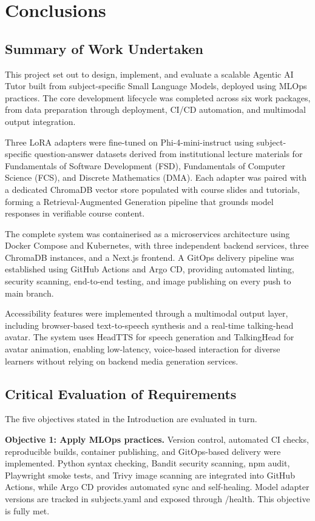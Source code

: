 \chapter{Conclusions}
\label{chap:conclusions}

\section{Summary of Work Undertaken}

This project set out to design, implement, and evaluate a scalable Agentic AI Tutor built from subject-specific Small Language Models, deployed using MLOps practices. The core development lifecycle was completed across six work packages, from data preparation through deployment, CI/CD automation, and multimodal output integration.

Three LoRA adapters were fine-tuned on Phi-4-mini-instruct using subject-specific question-answer datasets derived from institutional lecture materials for Fundamentals of Software Development (FSD), Fundamentals of Computer Science (FCS), and Discrete Mathematics (DMA). Each adapter was paired with a dedicated ChromaDB vector store populated with course slides and tutorials, forming a Retrieval-Augmented Generation pipeline that grounds model responses in verifiable course content.

The complete system was containerised as a microservices architecture using Docker Compose and Kubernetes, with three independent backend services, three ChromaDB instances, and a Next.js frontend. A GitOps delivery pipeline was established using GitHub Actions and Argo CD, providing automated linting, security scanning, end-to-end testing, and image publishing on every push to main branch.

Accessibility features were implemented through a multimodal output layer, including browser-based text-to-speech synthesis and a real-time talking-head avatar. The system uses HeadTTS for speech generation and TalkingHead for avatar animation, enabling low-latency, voice-based interaction for diverse learners without relying on backend media generation services.

\section{Critical Evaluation of Requirements}

The five objectives stated in the Introduction are evaluated in turn.

\textbf{Objective 1: Apply MLOps practices.} Version control, automated CI checks, reproducible builds, container publishing, and GitOps-based delivery were implemented. Python syntax checking, Bandit security scanning, npm audit, Playwright smoke tests, and Trivy image scanning are integrated into GitHub Actions, while Argo CD provides automated sync and self-healing. Model adapter versions are tracked in subjects.yaml and exposed through /health. This objective is fully met.

